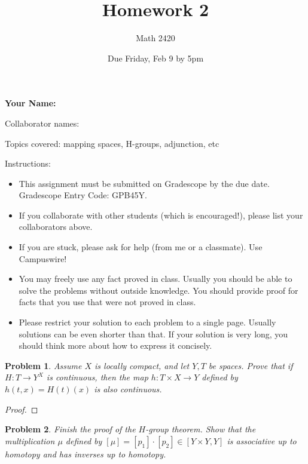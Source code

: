 \documentclass[11pt]{article}
\author{Math 2420}
\date{Due Friday, Feb 9 by 5pm}
\title{Homework 2}
\newtheorem{problem}{Problem}
\begin{document}
\maketitle

{\bf\Large Your Name:} 

Collaborator names: 


\vspace{.3in}
Topics covered: mapping spaces, H-groups, adjunction, etc

Instructions: 
\begin{itemize}
\item This assignment must be submitted on Gradescope by the due date. Gradescope Entry Code: GPB45Y. 
\item If you collaborate with other students (which is encouraged!), please list your collaborators above. 
\item If you are stuck, please ask for help (from me or a classmate). Use Campuswire!  
\item You may freely use any fact proved in class. Usually you should be able to solve the problems without outside knowledge. You should provide proof for facts that you use that were not proved in class. 
\item Please restrict your solution to each problem to a single page. Usually solutions can be even shorter than that. If your solution is very long, you should think more about how to express it concisely.
\end{itemize}
\pagebreak 



\begin{problem}
Assume $X$ is locally compact, and let $Y,T$ be spaces. Prove that if $H:T\to Y^X$ is continuous, then the map $h:T\times X\to Y$ defined by  $h(t,x)=H(t)(x)$ is also continuous. 
\end{problem}

\begin{proof}

\end{proof} 

\pagebreak 



\begin{problem}
Finish the proof of the $H$-group theorem. Show that the multiplication $\mu$ defined by $[\mu]=[p_1]\cdot[p_2]\in[Y\times Y,Y]$ is associative up to homotopy and has inverses up to homotopy. 
\end{problem}
\end{document}
